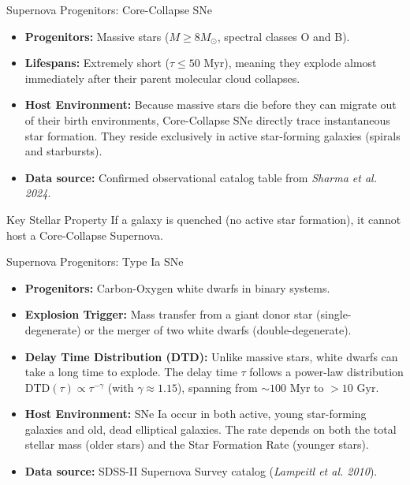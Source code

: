 \documentclass[9pt]{beamer}
\begin{document}
\begin{frame}{Supernova Progenitors: Core-Collapse SNe}
  \begin{itemize}
    \item \textbf{Progenitors:} Massive stars ($M \ge 8 M_\odot$, spectral classes O and B).
    \item \textbf{Lifespans:} Extremely short ($\tau \le 50\text{ Myr}$), meaning they explode almost immediately after their parent molecular cloud collapses.
    \item \textbf{Host Environment:}
      Because massive stars die before they can migrate out of their birth environments, Core-Collapse SNe directly trace instantaneous star formation. They reside exclusively in active star-forming galaxies (spirals and starbursts).
    \item \textbf{Data source:} Confirmed observational catalog table from \textit{Sharma et al. 2024}.
  \end{itemize}
  \begin{block}{Key Stellar Property}
    If a galaxy is quenched (no active star formation), it cannot host a Core-Collapse Supernova.
  \end{block}
\end{frame}

\begin{frame}{Supernova Progenitors: Type Ia SNe}
  \begin{itemize}
    \item \textbf{Progenitors:} Carbon-Oxygen white dwarfs in binary systems.
    \item \textbf{Explosion Trigger:} Mass transfer from a giant donor star (single-degenerate) or the merger of two white dwarfs (double-degenerate).
    \item \textbf{Delay Time Distribution (DTD):}
      Unlike massive stars, white dwarfs can take a long time to explode. The delay time $\tau$ follows a power-law distribution $\text{DTD}(\tau) \propto \tau^{-\gamma}$ (with $\gamma \approx 1.15$), spanning from $\sim 100\text{ Myr}$ to $> 10\text{ Gyr}$.
    \item \textbf{Host Environment:}
      SNe Ia occur in both active, young star-forming galaxies and old, dead elliptical galaxies. The rate depends on both the total stellar mass (older stars) and the Star Formation Rate (younger stars).
    \item \textbf{Data source:} SDSS-II Supernova Survey catalog (\textit{Lampeitl et al. 2010}).
  \end{itemize}
\end{frame}
\end{document}

